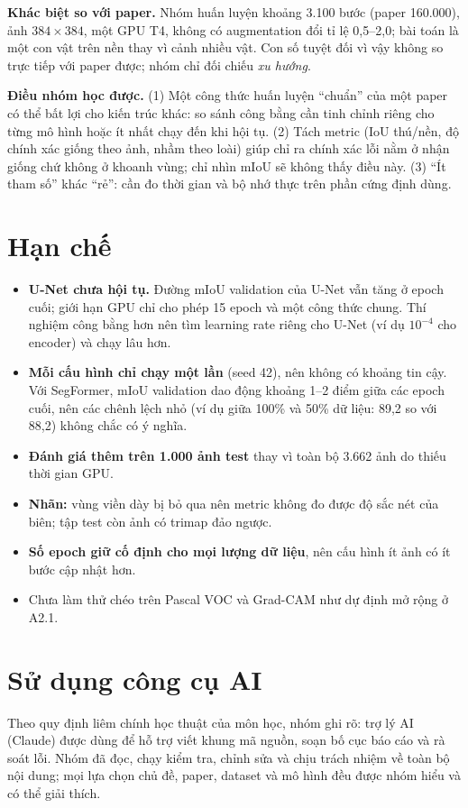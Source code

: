 \documentclass[12pt]{article}
\newcommand{\st}[1]{\textbf{#1}}
\begin{document}
\textbf{Khác biệt so với paper.} Nhóm huấn luyện khoảng 3.100 bước (paper 160.000), ảnh $384\times384$, một GPU T4, không có
augmentation đổi tỉ lệ 0,5--2,0; bài toán là một con vật trên nền thay vì cảnh nhiều vật. Con số tuyệt đối vì vậy không so
trực tiếp với paper được; nhóm chỉ đối chiếu \emph{xu hướng}.

\textbf{Điều nhóm học được.} (1) Một công thức huấn luyện ``chuẩn'' của một paper có thể bất lợi cho kiến trúc khác: so sánh
công bằng cần tinh chỉnh riêng cho từng mô hình hoặc ít nhất chạy đến khi hội tụ. (2) Tách metric (IoU thú/nền, độ chính
xác giống theo ảnh, nhầm theo loài) giúp chỉ ra chính xác lỗi nằm ở nhận giống chứ không ở khoanh vùng; chỉ nhìn mIoU sẽ không
thấy điều này. (3) ``Ít tham số'' khác ``rẻ'': cần đo thời gian và bộ nhớ thực trên phần cứng định dùng.

\section{Hạn chế}
\begin{itemize}
  \item \st{U-Net chưa hội tụ.} Đường mIoU validation của U-Net vẫn tăng ở epoch cuối; giới hạn GPU chỉ cho phép 15 epoch và
        một công thức chung. Thí nghiệm công bằng hơn nên tìm learning rate riêng cho U-Net (ví dụ $10^{-4}$ cho encoder) và
        chạy lâu hơn.
  \item \st{Mỗi cấu hình chỉ chạy một lần} (seed 42), nên không có khoảng tin cậy. Với SegFormer, mIoU validation dao động
        khoảng 1--2 điểm giữa các epoch cuối, nên các chênh lệch nhỏ (ví dụ giữa 100\% và 50\% dữ liệu: 89,2 so với 88,2)
        không chắc có ý nghĩa.
  \item \st{Đánh giá thêm trên 1.000 ảnh test} thay vì toàn bộ 3.662 ảnh do thiếu thời gian GPU.
  \item \st{Nhãn:} vùng viền dày bị bỏ qua nên metric không đo được độ sắc nét của biên; tập test còn ảnh có trimap đảo ngược.
  \item \st{Số epoch giữ cố định cho mọi lượng dữ liệu}, nên cấu hình ít ảnh có ít bước cập nhật hơn.
  \item Chưa làm thử chéo trên Pascal VOC và Grad-CAM như dự định mở rộng ở A2.1.
\end{itemize}

\section{Sử dụng công cụ AI}
Theo quy định liêm chính học thuật của môn học, nhóm ghi rõ: trợ lý AI (Claude) được dùng để hỗ trợ viết khung mã nguồn,
soạn bố cục báo cáo và rà soát lỗi. Nhóm đã đọc, chạy kiểm tra, chỉnh sửa và chịu trách nhiệm về toàn bộ nội dung;
mọi lựa chọn chủ đề, paper, dataset và mô hình đều được nhóm hiểu và có thể giải thích.
\end{document}
